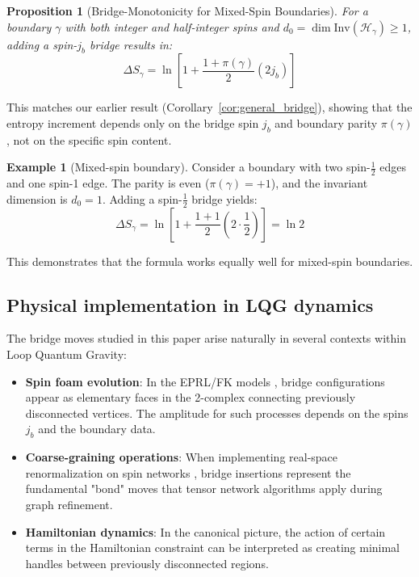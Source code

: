 \documentclass[11pt, a4paper]{article}
\theoremstyle{plain}
\newtheorem{proposition}[theorem]{Proposition}
\theoremstyle{definition}
\newtheorem{example}{Example}
\theoremstyle{remark}
\newcommand{\Inv}{\mathrm{Inv}}
\begin{document}
\begin{proposition}[Bridge-Monotonicity for Mixed-Spin Boundaries]
  \label{prop:mixed_spin}
  For a boundary $\gamma$ with both integer and half-integer spins and $d_0 = \dim\Inv(\mathcal{H}_{\gamma}) \geq 1$, adding a spin-$j_b$ bridge results in:
  \begin{equation}
    \Delta S_{\gamma} = \ln\left[1 + \frac{1+\pi(\gamma)}{2}(2j_b)\right]
  \end{equation}
\end{proposition}

This matches our earlier result (Corollary~\ref{cor:general_bridge}), showing that the entropy increment depends only on the bridge spin $j_b$ and boundary parity $\pi(\gamma)$, not on the specific spin content.

\begin{example}[Mixed-spin boundary]
  Consider a boundary with two spin-$\frac{1}{2}$ edges and one spin-1 edge. The parity is even ($\pi(\gamma)=+1$), and the invariant dimension is $d_0=1$. Adding a spin-$\frac{1}{2}$ bridge yields:
  \begin{equation}
    \Delta S_{\gamma} = \ln\left[1 + \frac{1+1}{2}(2\cdot\frac{1}{2})\right] = \ln 2
  \end{equation}

  This demonstrates that the formula works equally well for mixed-spin boundaries.
\end{example}

\subsection{Physical implementation in LQG dynamics}
\label{sec:lqg_dynamics}

The bridge moves studied in this paper arise naturally in several contexts within Loop Quantum Gravity:

\begin{itemize}
  \item \textbf{Spin foam evolution}: In the EPRL/FK models \cite{EnglePereira2008,FreidelKrasnov2008}, bridge configurations appear as elementary faces in the 2-complex connecting previously disconnected vertices. The amplitude for such processes depends on the spins $j_b$ and the boundary data.

  \item \textbf{Coarse-graining operations}: When implementing real-space renormalization on spin networks \cite{DittrichReview2017,Oriti2008}, bridge insertions represent the fundamental "bond" moves that tensor network algorithms apply during graph refinement.

  \item \textbf{Hamiltonian dynamics}: In the canonical picture, the action of certain terms in the Hamiltonian constraint \cite{ThiemannQSD1998} can be interpreted as creating minimal handles between previously disconnected regions.
\end{itemize}
\end{document}
